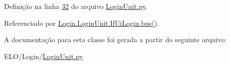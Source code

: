 Definição na linha \hyperlink{LoginUnit_8py_source_l00032}{32} do arquivo \hyperlink{LoginUnit_8py_source}{Login\-Unit.\-py}.



Referenciado por \hyperlink{classLogin_1_1LoginUnit_1_1IfUiLogin_abab63bd2085f485ca82494db8eb5f520}{Login.\-Login\-Unit.\-If\-Ui\-Login.\-bus()}.



A documentação para esta classe foi gerada a partir do seguinte arquivo\-:\begin{DoxyCompactItemize}
\item 
E\-L\-O/\-Login/\hyperlink{LoginUnit_8py}{Login\-Unit.\-py}\end{DoxyCompactItemize}
